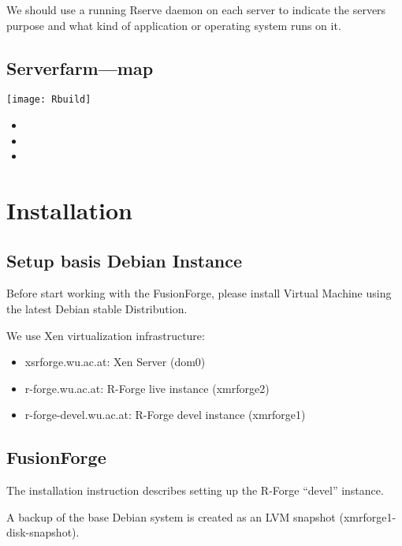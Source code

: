\documentclass[a4paper]{article}
\begin{document}
We should use a running Rserve daemon on each server to indicate the
servers purpose and what kind of application or operating system runs
on it.

\subsection{Serverfarm---map}

\texttt{[image: Rbuild]}

\begin{itemize}
\item
\item
\item
\end{itemize}

\section{Installation}
\label{sec:installation}

\subsection{Setup basis Debian Instance}

Before start working with the FusionForge, please install Virtual
Machine using the latest Debian stable Distribution. 

\vspace{0.5cm}
We use Xen virtualization infrastructure:

\begin{itemize}
	\item xsrforge.wu.ac.at: Xen Server (dom0)
	\item r-forge.wu.ac.at: R-Forge live instance (xmrforge2)
	\item r-forge-devel.wu.ac.at: R-Forge devel instance (xmrforge1)
\end{itemize}

\subsection{FusionForge}

The installation instruction describes setting up the R-Forge
``devel'' instance. 

A backup of the base Debian system is created as an 
LVM snapshot (xmrforge1-disk-snapshot).
\end{document}
